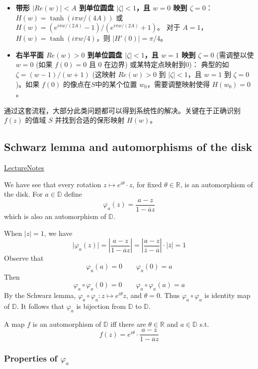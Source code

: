 \begin{itemize}
	\item \textbf{带形 $|Re(w)| < A$ 到单位圆盘 $|\zeta|<1$，且 $w=0$ 映到 $\zeta=0$}：
$H(w) = \tanh(i\pi w / (4A))$ 或 $H(w) = (e^{i\pi w/(2A)} - 1) / (e^{i\pi w/(2A)} + 1)$。
对于 $A=1$， $H(w) = \tanh(i\pi w/4)$，则 $|H'(0)| = \pi/4$。
	\item \textbf{右半平面 $Re(w) > 0$ 到单位圆盘 $|\zeta|<1$，且 $w=1$ 映到 $\zeta=0$} (需调整以使 $w=0$ (如果 $f(0)=0$ 且 $0$ 在边界) 或某特定点映射到0)：
典型的如 $\zeta = (w-1)/(w+1)$ (这映射 $Re(w)>0$ 到 $|\zeta|<1$，且 $w=1$ 到 $\zeta=0$)。如果 $f(0)$ 的像点在$S$中的某个位置 $w_0$，需要调整映射使得 $H(w_0)=0$。
\end{itemize}


通过这套流程，大部分此类问题都可以得到系统性的解决。关键在于正确识别 $f(z)$ 的值域 $S$ 并找到合适的保形映射 $H(w)$。

\subsection{Schwarz lemma and automorphisms of the disk}

\href{https://www.ma.imperial.ac.uk/~dcheragh/Teaching/2016-F-GCA/2016-F-GCA-Ch2.pdf}{LectureNotes}

We have see that every rotation $z\mapsto e^{ i\theta }\cdot z$, for fixed $\theta\in \mathbb{R}$, is an automorphism of the disk. For $a\in \mathbb{D}$ define
\[
\varphi_{a}(z)=\frac{a-z}{1-\overline{a}z}
\]
which is also an automorphism of $\mathbb{D}$.

When $\lvert z \rvert=1$, we have
\[
\lvert \varphi_{a}(z) \rvert =\left\lvert  \frac{a-z}{1-\overline{a}z}  \right\rvert =\left\lvert  \frac{a-z}{\overline{z}-\overline{a}}  \right\rvert \cdot \lvert \overline{z} \rvert =1
\]
Observe that
\[
\varphi_{a}(a)=0\qquad \varphi_{a}(0)=a
\]
Then
\[
\varphi_{a}\circ \varphi_{a}(0)=0\qquad \varphi_{a}\circ \varphi_{a}(a)=a
\]
By the Schwarz lemma, $\varphi _a\circ\varphi_{a}:z\mapsto e^{ i\theta }z$, and $\theta=0$. Thus $\varphi_{a}\circ\varphi_{a}$ is identity map of $\mathbb{D}$. It follows that $\varphi_{a}$ is bijection from $\mathbb{D}$ to $\mathbb{D}$.

\begin{theorem}
A map $f$ is an automorphism of $\mathbb{D}$ iff there are $\theta\in \mathbb{R}$ and $a\in \mathbb{D}$ s.t.
\[
f(z)=e^{ i\theta }\cdot\frac{a-z}{1-\overline{a}z}
\]
\end{theorem}
\subsubsection{Properties of \texorpdfstring{$\varphi_{a}$}{varphi_a}}

